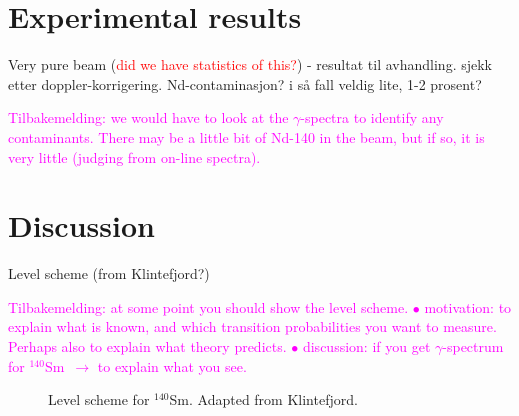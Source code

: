 \documentclass[twoside,english]{uiofysmaster/uiofysmaster}
\newcommand{\Sm}{$^{140}$Sm} %
\newcommand{\ga}{$\gamma$}
\begin{document}


\chapter{Experimental results}


Very pure beam (\textcolor{red}{did we have statistics of this?}) - resultat til avhandling. sjekk etter doppler-korrigering. Nd-contaminasjon? i så fall veldig lite, 1-2 prosent?

\textcolor{Magenta}{Tilbakemelding: \newline
we would have to look at the \ga-spectra to identify any contaminants. There may be a little bit of Nd-140 in the beam, but if so, it is very little (judging from on-line spectra).}




\chapter{Discussion}

Level scheme (from Klintefjord?)\newline

\textcolor{Magenta}{Tilbakemelding: \newline
at some point you should show the level scheme. \newline
$\bullet$ motivation: to explain what is known, and which transition probabilities you want to measure.  \newline
Perhaps also to explain what theory predicts. \newline
$\bullet$ discussion: if you get \ga-spectrum for \Sm\ $\rightarrow$ to explain what you see.}


\begin{figure}
	\centering
	
	\caption{Level scheme for \Sm. Adapted from Klintefjord.}
	\label{fig:levels}
\end{figure}




\end{document}
